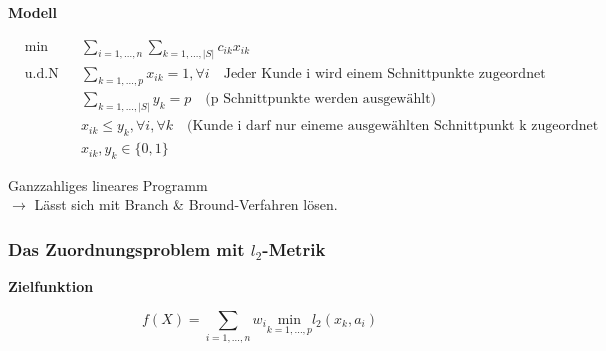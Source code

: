                
            

            \par \textbf{Modell}

            \begin{equation}
              \begin{aligned}
                & \underset{}{\text{min}}
                && \sum_{i=1,\dots, n}\sum_{k=1, \dots, |S|}c_{ik}x_{ik}\\
                & \text{u.d.N}
                & & \sum_{k = 1, \dots, p}x_{ik} = 1, \forall i \quad \text{Jeder Kunde i wird einem Schnittpunkte zugeordnet}\\
                & & & \sum_{k = 1, \dots, |S|}y_k = p \quad \text{(p Schnittpunkte werden ausgewählt)}\\ 
                & & & x_{ik} \leq y_k , \forall i, \forall k \quad \text{(Kunde i darf nur eineme ausgewählten Schnittpunkt k zugeordnet werden)}\\
                & & & x_{ik}, y_{k} \in \{0, 1\}
              \end{aligned}
              \label{p-Median Zuordnungsproblem}
            \end{equation}

            \par Ganzzahliges lineares Programm \\
            $\rightarrow$ Lässt sich mit Branch \& Bround-Verfahren lösen.





          \subsubsection{Das Zuordnungsproblem mit $l_2$-Metrik} %
          \label{ssub:das_zuordnungsproblem_mit_metrik}
          
            \par \textbf{Zielfunktion}         

            \begin{equation}
               f(X) = \sum_{i = 1, \dots, n}w_i\underset{k=1,\dots,p}{\text{min}}l_2(x_k, a_i)
            \end{equation} 

